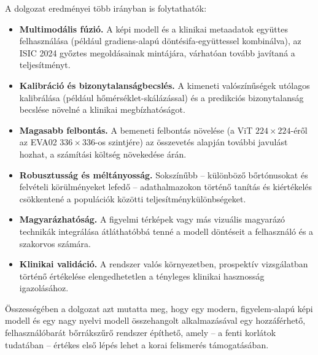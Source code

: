 A dolgozat eredményei több irányban is folytathatók:

\begin{itemize}
  \item \textbf{Multimodális fúzió.} A képi modell és a klinikai metaadatok
  együttes felhasználása (például gradiens-alapú döntésifa-együttessel
  kombinálva), az ISIC 2024 győztes megoldásainak mintájára, várhatóan tovább
  javítaná a teljesítményt.
  \item \textbf{Kalibráció és bizonytalanságbecslés.} A kimeneti valószínűségek
  utólagos kalibrálása (például hőmérséklet-skálázással) és a predikciós
  bizonytalanság becslése növelné a klinikai megbízhatóságot.
  \item \textbf{Magasabb felbontás.} A bemeneti felbontás növelése (a ViT
  $224\times224$-éről az EVA02 $336\times336$-os szintjére) az összevetés alapján
  további javulást hozhat, a számítási költség növekedése árán.
  \item \textbf{Robusztusság és méltányosság.} Sokszínűbb -- különböző
  bőrtónusokat és felvételi körülményeket lefedő -- adathalmazokon történő
  tanítás és kiértékelés csökkentené a populációk közötti
  teljesítménykülönbségeket.
  \item \textbf{Magyarázhatóság.} A figyelmi térképek vagy más vizuális
  magyarázó technikák integrálása átláthatóbbá tenné a modell döntéseit a
  felhasználó és a szakorvos számára.
  \item \textbf{Klinikai validáció.} A rendszer valós környezetben, prospektív
  vizsgálatban történő értékelése elengedhetetlen a tényleges klinikai
  hasznosság igazolásához.
\end{itemize}

Összességében a dolgozat azt mutatta meg, hogy egy modern, figyelem-alapú képi
modell és egy nagy nyelvi modell összehangolt alkalmazásával egy hozzáférhető,
felhasználóbarát bőrrákszűrő rendszer építhető, amely -- a fenti korlátok
tudatában -- értékes első lépés lehet a korai felismerés támogatásában.
